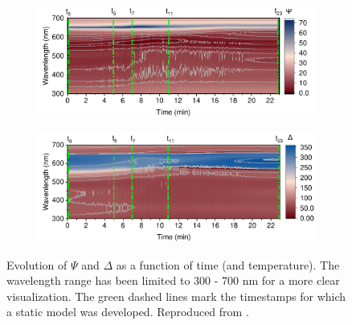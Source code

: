 \begin{figure}[ht!]
    \centering
    \begin{subfigure}[t]{0.9\textwidth} %
        \centering
        \includegraphics[width=\textwidth]{chapters/ellipsometry/image/Psi_Contour - MRS.pdf} %
    \end{subfigure}

    \vspace{1em} %

    \begin{subfigure}[t]{0.9\textwidth} %
        \centering
        \includegraphics[width=\textwidth]{chapters/ellipsometry/image/Delta_Contour - MRS.pdf} %
    \end{subfigure}

    \caption[Evolution of $\Psi$ and $\Delta$ as a function of time and temperature]{Evolution of $\Psi$ and $\Delta$ as a function of time (and temperature). The wavelength range has been limited to 300 - 700 nm for a more clear visualization. The green dashed lines mark the timestamps for which a static model was developed. Reproduced from \cite{Papadopoulou2024InEllipsometry}.}
    \label{fig:ellipsometry:raw_psi_delta}
\end{figure}

